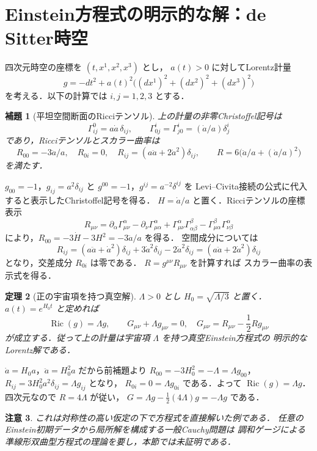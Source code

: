 \documentclass[a5paper,10pt,onecolumn]{jsarticle}
\makeatletter
\theoremstyle{mathnotetheorem}
\newtheorem{theorem}{定理}[section]
\newtheorem{lemma}[theorem]{補題}
\newtheorem{remark}[theorem]{注意}
\renewcommand{\proofname}{証明}
\renewenvironment{proof}[1][\proofname]{%
  \par\pushQED{\qed}\normalfont\topsep4\p@\@plus2\p@\relax
  \trivlist\item[\hskip\labelsep\bfseries #1]\ignorespaces
}{\popQED\endtrivlist\@endpefalse}
\makeatother
\begin{document}
\section{Einstein方程式の明示的な解：de Sitter時空}
四次元時空の座標を $(t,x^1,x^2,x^3)$ とし，
$a(t)>0$ に対してLorentz計量
\[
 g=-dt^2+a(t)^2\bigl((dx^1)^2+(dx^2)^2+(dx^3)^2\bigr)
\]
を考える．以下の計算では $i,j=1,2,3$ とする．
\begin{lemma}[平坦空間断面のRicciテンソル]
上の計量の非零Christoffel記号は
\[
 \Gamma^0_{ij}=a\dot a\,\delta_{ij},\qquad
 \Gamma^i_{0j}=\Gamma^i_{j0}=(\dot a/a)\delta^i_j
\]
であり，Ricciテンソルとスカラー曲率は
\[
 R_{00}=-3\ddot a/a,\quad R_{0i}=0,\quad
 R_{ij}=(a\ddot a+2\dot a^2)\delta_{ij},\qquad
 R=6\bigl(\ddot a/a+(\dot a/a)^2\bigr)
\]
を満たす．
\end{lemma}
\begin{proof}
$g_{00}=-1$，$g_{ij}=a^2\delta_{ij}$ と
$g^{00}=-1$，$g^{ij}=a^{-2}\delta^{ij}$ を
Levi--Civita接続の公式に代入すると表示したChristoffel記号を得る．
$H=\dot a/a$ と置く．Ricciテンソルの座標表示
\[
 R_{\mu\nu}=\partial_\alpha\Gamma^\alpha_{\mu\nu}
 -\partial_\nu\Gamma^\alpha_{\mu\alpha}
 +\Gamma^\alpha_{\mu\nu}\Gamma^\beta_{\alpha\beta}
 -\Gamma^\beta_{\mu\alpha}\Gamma^\alpha_{\nu\beta}
\]
により，$R_{00}=-3\dot H-3H^2=-3\ddot a/a$ を得る．
空間成分については
\[
 R_{ij}=(a\ddot a+\dot a^2)\delta_{ij}
 +3\dot a^2\delta_{ij}-2\dot a^2\delta_{ij}
 =(a\ddot a+2\dot a^2)\delta_{ij}
\]
となり，交差成分 $R_{0i}$ は零である．
$R=g^{\mu\nu}R_{\mu\nu}$ を計算すれば
スカラー曲率の表示式を得る．
\end{proof}
\begin{theorem}[正の宇宙項を持つ真空解]
$\Lambda>0$ とし $H_0=\sqrt{\Lambda/3}$ と置く．
$a(t)=e^{H_0t}$ と定めれば
\[
 \operatorname{Ric}(g)=\Lambda g,\qquad
 G_{\mu\nu}+\Lambda g_{\mu\nu}=0,
 \quad G_{\mu\nu}=R_{\mu\nu}-\frac12 Rg_{\mu\nu}
\]
が成立する．従って上の計量は宇宙項 $\Lambda$ を持つ真空Einstein方程式の
明示的なLorentz解である．
\end{theorem}
\begin{proof}
$\dot a=H_0a$，$\ddot a=H_0^2a$ だから前補題より
$R_{00}=-3H_0^2=-\Lambda=\Lambda g_{00}$，
$R_{ij}=3H_0^2a^2\delta_{ij}=\Lambda g_{ij}$ となり，
$R_{0i}=0=\Lambda g_{0i}$ である．よって
$\operatorname{Ric}(g)=\Lambda g$．
四次元なので $R=4\Lambda$ が従い，
$G=\Lambda g-\frac12(4\Lambda)g=-\Lambda g$ である．
\end{proof}
\begin{remark}
これは対称性の高い仮定の下で方程式を直接解いた例である．
任意のEinstein初期データから局所解を構成する一般Cauchy問題は
調和ゲージによる準線形双曲型方程式の理論を要し，本節では未証明である．
\end{remark}
\end{document}
